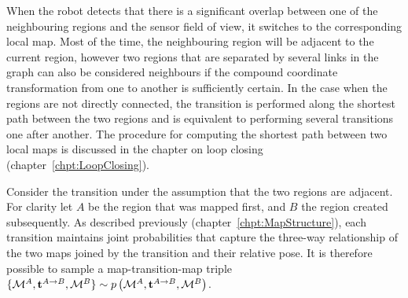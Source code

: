 When the robot detects that there is a significant overlap between one
of the neighbouring regions and the sensor field of view, it switches
to the corresponding local map. Most of the time, the neighbouring
region will be adjacent to the current region, however two regions
that are separated by several links in the graph can also be
considered neighbours if the compound coordinate transformation from
one to another is sufficiently certain.  In the case when the regions
are not directly connected, the transition is performed along the
shortest path between the two regions and is equivalent to performing
several transitions one after another. The procedure for computing the
shortest path between two local maps is discussed in the chapter on
loop closing (chapter~\ref{chpt:LoopClosing}).

Consider the transition under the assumption that the two regions are
adjacent. For clarity let $A$ be the region that was mapped first, and
$B$ the region created subsequently. As described previously
(chapter~\ref{chpt:MapStructure}), each transition maintains joint
probabilities that capture the three-way relationship of the two maps
joined by the transition and their relative pose. It is therefore
possible to sample a map-transition-map triple $\{
{\mapA,\tr{}{A}{B},\mapB} \} \sim \prob{\mapA,\tr{}{A}{B},\mapB} $.
 


